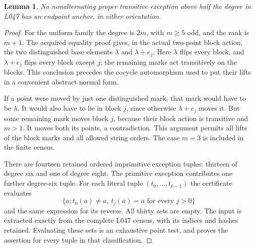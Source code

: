 \documentclass[11pt,a4paper]{article}
\newtheorem{lemma}[theorem]{Lemma}
\begin{document}
\begin{lemma}\label{nonalt}
No nonalternating proper transitive exception above half the degree
in L047 has an endpoint anchor, in either orientation.
\end{lemma}
\begin{proof}
For the uniform family the degree is $2m$, with $m\ge5$ odd,
and the rank is $m+1$. The acquired equality proof gives, in the
actual two-point block action, the two distinguished base elements
$\lambda$ and $\lambda+e_j$. Here $\lambda$ flips every block,
and $\lambda+e_j$ flips every block except $j$; the remaining
marks act transitively on the blocks. This conclusion precedes
the cocycle automorphism used to put their lifts in a convenient
abstract normal form.

If a point were moved by just one distinguished mark, that mark
would have to be $\lambda$. It would also have to lie in block
$j$, since otherwise $\lambda+e_j$ moves it. But some remaining
mark moves block $j$, because their block action is transitive
and $m>1$. It moves both its points, a contradiction. This
argument permits all lifts of the block marks and all allowed
string orders. The case $m=3$ is included in the finite census.

There are fourteen retained ordered imprimitive exception tuples:
thirteen of degree six and one of degree eight. The primitive
exception contributes one further degree-six tuple. For each
literal tuple $(t_0,\ldots,t_{k-1})$ the certificate evaluates
\[
 \{a:t_0(a)\ne a,\ t_j(a)=a\text{ for every }j>0\}
\]
and the same expression for its reverse. All thirty sets are
empty. The input is extracted exactly from the complete L047
census, with its indices and hashes retained. Evaluating these
sets is an exhaustive point test, and proves the assertion for
every tuple in that classification.
\end{proof}
\end{document}
